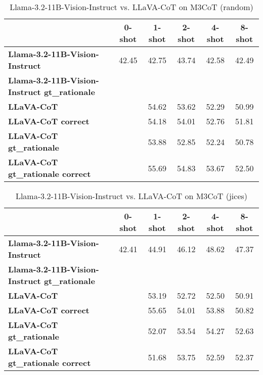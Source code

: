 \begin{table}
\caption{Llama-3.2-11B-Vision-Instruct vs. LLaVA-CoT on M3CoT (random)}
\label{tab:Llama-3.2-11B-Vision-Instruct_M3CoT_TRAIN_random}
\begin{tabular}{lccccc}
\toprule
 & 0-shot & 1-shot & 2-shot & 4-shot & 8-shot \\
\midrule
\textbf{Llama-3.2-11B-Vision-Instruct} & 42.45 & 42.75 & 43.74 & 42.58 & 42.49 \\
\textbf{Llama-3.2-11B-Vision-Instruct gt\_rationale} &  &  &  &  &  \\
\textbf{LLaVA-CoT} &  & 54.62 & 53.62 & 52.29 & 50.99 \\
\textbf{LLaVA-CoT correct} &  & 54.18 & 54.01 & 52.76 & 51.81 \\
\textbf{LLaVA-CoT gt\_rationale} &  & 53.88 & 52.85 & 52.24 & 50.78 \\
\textbf{LLaVA-CoT gt\_rationale correct} &  & 55.69 & 54.83 & 53.67 & 52.50 \\
\bottomrule
\end{tabular}
\end{table}


\begin{table}
\caption{Llama-3.2-11B-Vision-Instruct vs. LLaVA-CoT on M3CoT (jices)}
\label{tab:Llama-3.2-11B-Vision-Instruct_M3CoT_TRAIN_jices}
\begin{tabular}{lccccc}
\toprule
 & 0-shot & 1-shot & 2-shot & 4-shot & 8-shot \\
\midrule
\textbf{Llama-3.2-11B-Vision-Instruct} & 42.41 & 44.91 & 46.12 & 48.62 & 47.37 \\
\textbf{Llama-3.2-11B-Vision-Instruct gt\_rationale} &  &  &  &  &  \\
\textbf{LLaVA-CoT} &  & 53.19 & 52.72 & 52.50 & 50.91 \\
\textbf{LLaVA-CoT correct} &  & 55.65 & 54.01 & 53.88 & 50.82 \\
\textbf{LLaVA-CoT gt\_rationale} &  & 52.07 & 53.54 & 54.27 & 52.63 \\
\textbf{LLaVA-CoT gt\_rationale correct} &  & 51.68 & 53.75 & 52.59 & 52.37 \\
\bottomrule
\end{tabular}
\end{table}


